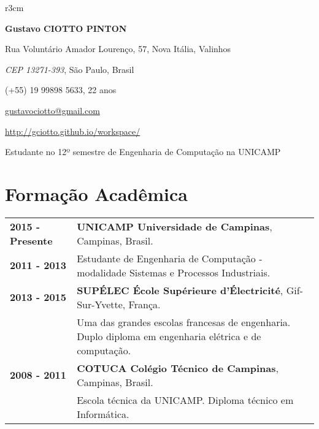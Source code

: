 \documentclass[10pt, a4paper]{article}
\author{Gustavo Ciotto Pinton}
\begin{document}
\pagestyle{empty} 

\begin{wrapfigure}{r}{3cm}
  \vspace{-20pt}
  \begin{center}
  \end{center}
\end{wrapfigure}

\textbf{\LARGE Gustavo CIOTTO PINTON}

Rua Voluntário Amador Lourenço, 57, Nova Itália, Valinhos

\textit{CEP 13271-393}, São Paulo, Brasil

(+55) 19 99898 5633, 22 anos

\url{gustavociotto@gmail.com} 

\url{http://gciotto.github.io/workspace/}

\vspace{8pt}

{\centerline {\large Estudante no 12º semestre de Engenharia de
Computação na UNICAMP}}



\section{Formação Acadêmica}

\begin{tabular}{p{} p{}}

 \textbf{2015 - Presente} & \textbf{UNICAMP Universidade de Campinas}, Campinas,
 Brasil.
 \\
 \textbf{2011 - 2013} & Estudante de Engenharia de Computação - modalidade
 Sistemas e Processos Industriais. \vspace{8pt}\\

 \textbf{2013 - 2015} & \textbf{SUPÉLEC  École Supérieure d'Électricité},
 Gif-Sur-Yvette, França. \\
 & Uma das grandes escolas francesas de engenharia. Duplo diploma em
 engenharia elétrica e de computação. \vspace{8pt}
 \\
  
 
 \textbf{2008 - 2011} & \textbf{COTUCA Colégio Técnico de Campinas}, Campinas,
 Brasil. \\
 & Escola técnica da UNICAMP. Diploma técnico em Informática. \\
\end{tabular}
\end{document}
